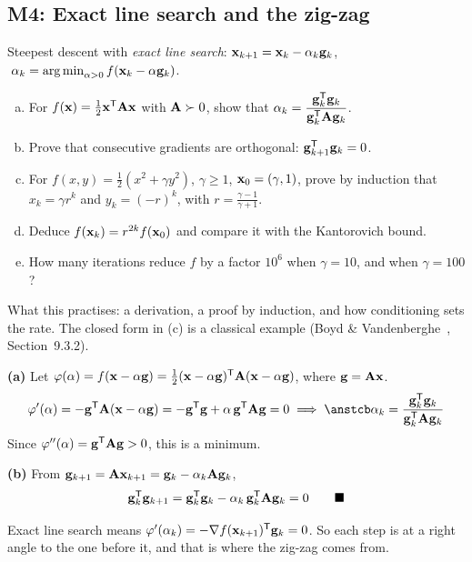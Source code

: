 \subsection{M4: Exact line search and the zig-zag}

\begin{frame}{}
  \begin{probbox}
    Steepest descent with \emph{exact line search}:
    $\mathbf{x}_{k+1} = \mathbf{x}_k - \alpha_k\mathbf{g}_k$, $\;\alpha_k = \operatorname*{arg\,min}_{\alpha>0} f(\mathbf{x}_k - \alpha\mathbf{g}_k)$.
    \begin{enumerate}[(a)]
      \item For $f(\mathbf{x}) = \tfrac12\mathbf{x}^{\mathsf T}\mathbf{A}\mathbf{x}$ with $\mathbf{A} \succ 0$, show that $\alpha_k = \dfrac{\mathbf{g}_k^{\mathsf T}\mathbf{g}_k}{\mathbf{g}_k^{\mathsf T}\mathbf{A}\mathbf{g}_k}$.
      \item Prove that consecutive gradients are orthogonal: $\mathbf{g}_{k+1}^{\mathsf T}\mathbf{g}_k = 0$.
      \item For $f(x,y) = \tfrac12(x^2 + \gamma y^2)$, $\gamma\ge1$, $\mathbf{x}_0 = (\gamma,1)$, prove by induction that
            $x_k = \gamma r^k$ and $y_k = (-r)^k$, with $r = \frac{\gamma-1}{\gamma+1}$.
      \item Deduce $f(\mathbf{x}_k) = r^{2k}f(\mathbf{x}_0)$ and compare it with the Kantorovich bound.
      \item How many iterations reduce $f$ by a factor $10^6$ when $\gamma = 10$, and when $\gamma = 100$?
    \end{enumerate}
  \end{probbox}
  \footnotesize\textcolor{mGrey}{What this practises: a derivation, a proof by induction, and how conditioning sets the rate.
  The closed form in (c) is a classical example (Boyd \& Vandenberghe~\cite{boyd2004}, Section~9.3.2).}
\end{frame}

\begin{frame}{}
  \textbf{(a)} Let $\varphi(\alpha) = f(\mathbf{x} - \alpha\mathbf{g}) = \tfrac12(\mathbf{x}-\alpha\mathbf{g})^{\mathsf T}\mathbf{A}(\mathbf{x}-\alpha\mathbf{g})$, where $\mathbf{g} = \mathbf{A}\mathbf{x}$.
  \[
    \varphi'(\alpha) = -\g\T\bA(\x - \alpha\g) = -\g\T\g + \alpha\,\g\T\bA\g = 0
    \;\Longrightarrow\; \ans{\alpha_k = \frac{\g_k\T\g_k}{\g_k\T\bA\g_k}}
  \]
  Since $\varphi''(\alpha) = \mathbf{g}^{\mathsf T}\mathbf{A}\mathbf{g} > 0$, this is a minimum.

  \vspace{4pt}
  \textbf{(b)} From $\mathbf{g}_{k+1} = \mathbf{A}\mathbf{x}_{k+1} = \mathbf{g}_k - \alpha_k\mathbf{A}\mathbf{g}_k$,
  \[
    \mathbf{g}_k^{\mathsf T}\mathbf{g}_{k+1} = \mathbf{g}_k^{\mathsf T}\mathbf{g}_k - \alpha_k\,\mathbf{g}_k^{\mathsf T}\mathbf{A}\mathbf{g}_k = 0 \qquad\blacksquare
  \]
  \begin{keybox}
    Exact line search means $\varphi'(\alpha_k) = -\nabla f(\mathbf{x}_{k+1})^{\mathsf T}\mathbf{g}_k = 0$.
    So each step is at a \alert{right angle} to the one before it, and that is where the zig-zag comes from.
  \end{keybox}
\end{frame}

